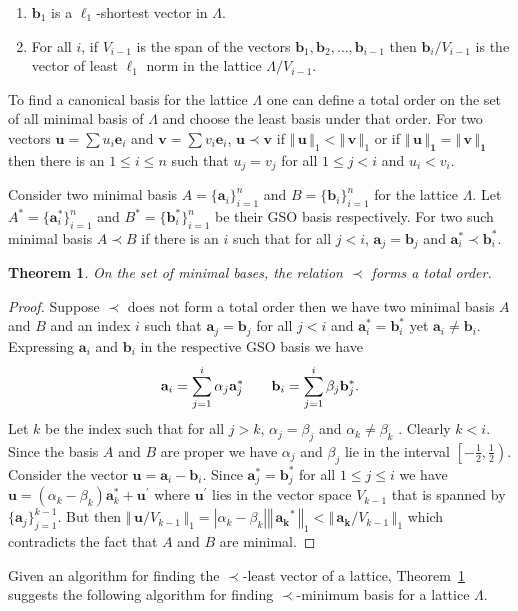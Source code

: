 \documentclass{article}
\newtheorem{theorem}{Theorem}[section]
\theoremstyle{definition}\newtheorem{remark}[theorem]{Remark}
\newcommand {\norm} [1] {\ensuremath {\left\Vert\,#1\,\right\Vert}}
\renewcommand{\vector}[1]{\ensuremath{\mathbf{#1}}}
\begin{document}
\begin{enumerate}
\item $\vector{b}_1$ is a $\ell_1$-shortest vector in
  $\Lambda$.
  \item For all $i$, if $V_{i-1}$ is the span of the vectors
    $\vector{b}_1, \vector{b}_2,\ldots,\vector{b}_{i-1}$ then
    $\vector{b}_i/V_{i-1}$ is the vector of least $\ell_1$ norm in the
    lattice $\Lambda/V_{i-1}$.
\end{enumerate}

To find a canonical basis for the lattice $\Lambda$ one can define a
total order on the set of all minimal basis of $\Lambda$ and choose
the least basis under that order. For two vectors $\vector{u} = \sum
u_i \vector{e}_i$ and $\vector{v} = \sum v_i \vector{e}_i$,
$\vector{u} \prec \vector{v}$ if $\norm{\vector{u}}_1 <
\norm{\vector{v}}_1$ or if $\vector{\norm{u}_1 = \norm{v}_1}$ then
there is an $1 \leq i \leq n$ such that $u_j =v_j$ for all $1 \leq j <
i$ and $u_i < v_i$.

Consider two minimal basis $A = \{ \vector{a}_i \}_{i=1}^n$ and $B =
\{\vector{b}_i\}_{i=1}^n$ for the lattice $\Lambda$. Let $A^* = \{
\vector{a}_i^*\}_{i=1}^n$ and $B^* = \{ \vector{b}_i^*\}_{i=1}^n$ be
their GSO basis respectively. For two such minimal basis $A \prec B$
if there is an $i$ such that for all $j < i $, $\vector{a}_j =
\vector{b}_j$ and $\vector{a}_i^* \prec \vector{b}_i^*$.

\begin{theorem}\label{total-order}
  On the set of minimal bases, the relation $\prec$ forms a total
  order.
\end{theorem}
\begin{proof}
  Suppose $\prec$ does not form a total order then we have two minimal
  basis $A$ and $B$ and an index $i$ such that $\vector{a}_j =
  \vector{b}_j$ for all $j < i$ and $\vector{a}_i^* = \vector{b}_i^*$
  yet $\vector{a}_i \neq \vector{b}_i$. Expressing $\vector{a}_i$ and
  $\vector{b}_i$ in the respective GSO basis we have
\[ 
\vector{a}_i = \sum_{j=1}^{i} \alpha_j \vector{a}_j^*
\hbox{~~~~~~}\vector{b}_i = \sum_{j=1}^i \beta_j \vector{b}_j^*.
\]  
  Let $k$ be the index such that for all $j > k$, $\alpha_j = \beta_j$
  and $\alpha_k \neq \beta_k$ .  Clearly $k < i$. Since the basis $A$
  and $B$ are proper we have $\alpha_j$ and $\beta_j$ lie in the
  interval $\left[-\frac{1}{2},\frac{1}{2}\right)$. Consider the
  vector $\vector{u} = \vector{a}_i - \vector{b}_i$. Since
  $\vector{a}_j^* = \vector{b}_j^*$ for all $1 \leq j \leq i$ we have
  $\vector{u} = (\alpha_k - \beta_k) \vector{a}_k^* +
  \vector{u}^\prime$ where $\vector{u}^\prime$ lies in the vector
  space $V_{k-1}$ that is spanned by $\{ \vector{a}_j \}_{j=1}^{k-1}$.
  But then $\norm{\vector{u}/V_{k-1}}_1 = |\alpha_k - \beta_k|
  \norm{\vector{a_k}^*}_1 < \norm{\vector{a_k}/V_{k-1}}_1$ which
  contradicts the fact that $A$ and $B$ are minimal.
\end{proof}
Given an algorithm for finding the $\prec$-least vector of a lattice,
Theorem~\ref{total-order} suggests the following algorithm for finding
$\prec$-minimum basis for a lattice $\Lambda$.
\end{document}
